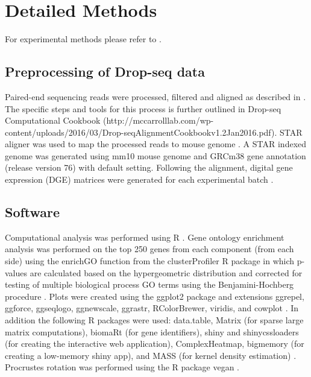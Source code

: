 \section{Detailed Methods}
For experimental methods please refer to \cite{Jung2019Unified}.

\subsection{Preprocessing of Drop-seq data}

Paired-end sequencing reads were processed, filtered and aligned as described in \cite{Macosko2015Highly}. The specific steps and tools for this process is further outlined in Drop-seq Computational Cookbook (http://mccarrolllab.com/wp-content/uploads/2016/03/Drop-seqAlignmentCookbookv1.2Jan2016.pdf). STAR aligner was used to map the processed reads to mouse genome \parencite{Dobin2013STAR}. A STAR indexed genome was generated using mm10 mouse genome and GRCm38 gene annotation (release version 76) with default setting. Following the alignment, digital gene expression (DGE) matrices were generated for each experimental batch \cite{Macosko2015Highly}.

\subsection{Software}
Computational analysis was performed using R \parencite{RCoreTeam2018Language}. Gene ontology enrichment analysis was performed on the top 250 genes from each component (from each side) using the enrichGO function from the clusterProfiler R package in which p-values are calculated based on the hypergeometric distribution and corrected for testing of multiple biological process GO terms using the Benjamini-Hochberg procedure \parencite{Yu2012clusterProfiler}. Plots were created using the ggplot2 package and extensions ggrepel, ggforce, ggseqlogo, ggnewscale, ggrastr, RColorBrewer, viridis, and cowplot \parencite{Campitelli2019ggnewscale, Garnier2018viridis, Neuwirth2014RColorBrewer, Pedersen2016ggforce, Petukhov2018ggrastr, Wagih2017ggseqlogo, Wickham2016ggplot2, Wilke2018cowplot}. In addition the following R packages were used: data.table, Matrix (for sparse large matrix computations), biomaRt (for gene identifiers), shiny and shinycssloaders (for creating the interactive web application), ComplexHeatmap, bigmemory (for creating a low-memory shiny app), and MASS (for kernel density estimation) \parencite{Bates2018Matrix, Chang2018shiny, Dowle2019data, Durinck2005BioMart, Gu2016Complex, Kane2013Scalable, Sali2017shinycssloaders, Venables2002Modern}. Procrustes rotation was performed using the R package vegan \parencite{Lin2019NNLM, Oksanen2019vegan}.


